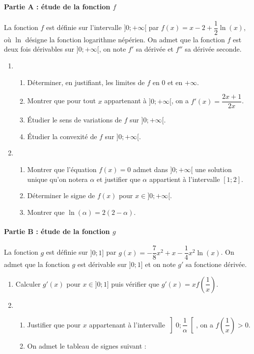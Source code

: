 \documentclass[11pt,fleqn, openany]{book} %
\begin{document}
\begin{exercise}[topic=int04, subtitle={(Métropole 2024)}]

\paragraph{Partie A : étude de la fonction $f$}

La fonction $f$ est définie sur l'intervalle $]0;+\infty[$ par $f(x)=x-2+\dfrac{1}{2}\ln (x)$, où $\ln$ désigne la fonction logarithme népérien. On admet que la fonction $f$ est deux fois dérivables sur $]0;+\infty[$, on note $f'$ sa dérivée et $f''$ sa dérivée seconde.

\begin{enumerate}
\item \begin{enumerate}
\item Déterminer, en justifiant, les limites de $f$ en 0 et en $+\infty$.
\item Montrer que pour tout $x$ appartenant à $]0;+\infty [$, on a $f'(x)=\dfrac{2x+1}{2x}$.
\item Étudier le sens de variations de $f$ sur $]0;+\infty[$.
\item Étudier la convexité de $f$ sur $]0 ;+\infty[$.
\end{enumerate}
\item \begin{enumerate}
\item Montrer que l'équation $f(x)=0$ admet dans $]0;+\infty[$ une solution unique qu'on notera $\alpha$ et justifier que $\alpha$ appartient à l'intervalle $[1;2]$.
\item Déterminer le signe de $f(x)$ pour $x\in ]0;+\infty[$.
\item Montrer que $\ln(\alpha)=2(2-\alpha)$.
\end{enumerate}\end{enumerate}

\paragraph{Partie B : étude de la fonction $g$}

La fonction $g$ est définie sur $]0;1]$ par $g(x)=-\dfrac{7}{8}x^2+x-\dfrac{1}{4}x^2\ln(x)$. On admet que la fonction $g$ est dérivable sur $]0;1]$ et on note $g'$ sa fonctione dérivée.

\begin{enumerate}
\item Calculer $g'(x)$ pour $x\in ]0;1]$ puis vérifier que $g'(x)=xf\left(\dfrac{1}{x}\right)$.
\item \begin{enumerate}
\item Justifier que pour $x$ appartenant à l'intervalle $ \left] 0 ; \dfrac{1}{\alpha} \right[$, on a $f\left(\dfrac{1}{x}\right)>0$.
\item On admet le tableau de signes suivant :


\end{enumerate}
\end{enumerate}
\end{exercise}
\end{document}
